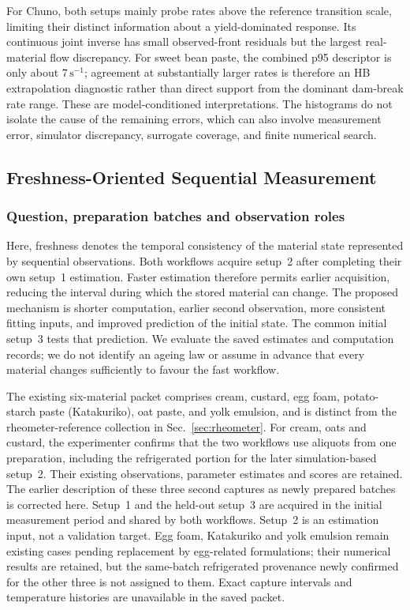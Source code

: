 For Chuno, both setups mainly probe rates above the reference
transition scale, limiting their distinct information about a
yield-dominated response. Its continuous joint inverse has small
observed-front residuals but the largest real-material flow discrepancy.
For sweet bean paste, the combined p95 descriptor is only about
$7\,\mathrm{s}^{-1}$; agreement at substantially larger rates is
therefore an HB extrapolation diagnostic rather than direct support
from the dominant dam-break rate range. These are model-conditioned
interpretations. The histograms do not isolate the cause of the
remaining errors, which can also involve measurement error, simulator
discrepancy, surrogate coverage, and finite numerical search.



\subsection{Freshness-Oriented Sequential Measurement}
\label{sec:freshness}

\subsubsection{Question, preparation batches and observation roles}
Here, freshness denotes the temporal consistency of the material state represented by sequential observations. Both workflows acquire setup~2 after completing their own setup~1 estimation. Faster estimation therefore permits earlier acquisition, reducing the interval during which the stored material can change. The proposed mechanism is shorter computation, earlier second observation, more consistent fitting inputs, and improved prediction of the initial state. The common initial setup~3 tests that prediction. We evaluate the saved estimates and computation records; we do not identify an ageing law or assume in advance that every material changes sufficiently to favour the fast workflow.

The existing six-material packet comprises cream, custard, egg foam, potato-starch paste (Katakuriko), oat paste, and yolk emulsion, and is distinct from the rheometer-reference collection in Sec.~\ref{sec:rheometer}. For cream, oats and custard, the experimenter confirms that the two workflows use aliquots from one preparation, including the refrigerated portion for the later simulation-based setup~2. Their existing observations, parameter estimates and scores are retained. The earlier description of these three second captures as newly prepared batches is corrected here. Setup~1 and the held-out setup~3 are acquired in the initial measurement period and shared by both workflows. Setup~2 is an estimation input, not a validation target. Egg foam, Katakuriko and yolk emulsion remain existing cases pending replacement by egg-related formulations; their numerical results are retained, but the same-batch refrigerated provenance newly confirmed for the other three is not assigned to them. Exact capture intervals and temperature histories are unavailable in the saved packet.

